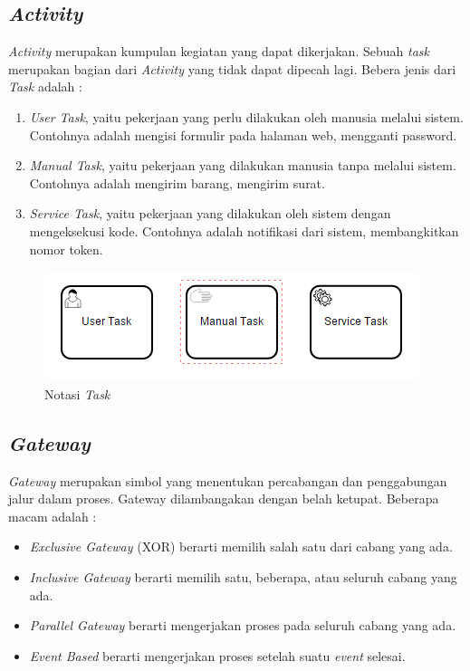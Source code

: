 \subsection{\textit{Activity}}
\label{sec:activity}
\textit{Activity} merupakan kumpulan kegiatan yang dapat dikerjakan. Sebuah \textit{task} merupakan bagian dari \textit{Activity} yang tidak dapat dipecah lagi. Bebera jenis dari \textit{Task} adalah :
	\begin{enumerate}
		\item{\textit{User Task}}, yaitu pekerjaan yang perlu dilakukan oleh manusia melalui sistem. Contohnya adalah mengisi formulir pada halaman web, mengganti password.
		\item{\textit{Manual Task}}, yaitu pekerjaan yang dilakukan manusia tanpa melalui sistem. Contohnya adalah mengirim barang, mengirim surat.
		\item{\textit{Service Task}}, yaitu pekerjaan yang dilakukan oleh sistem dengan mengeksekusi kode. Contohnya adalah notifikasi dari sistem, membangkitkan nomor token. 
	\end{enumerate}
	
	
\begin{figure}[H]
	\centering
	\includegraphics[scale=1]{Gambar/Bab-2/bpmn/task}
	\caption{Notasi \textit{Task}} 
	\label{task}
\end{figure}

\subsection{\textit{Gateway}}
\label{sec:gateway}
\textit{Gateway} merupakan simbol yang menentukan percabangan dan penggabungan jalur dalam proses. Gateway dilambangakan dengan belah ketupat. Beberapa macam adalah :
\begin{itemize}
	\item \textit{Exclusive Gateway} (XOR) berarti memilih salah satu dari cabang yang ada. 
	\item \textit{Inclusive Gateway} berarti memilih satu, beberapa, atau seluruh cabang yang ada.
	\item \textit{Parallel Gateway} berarti mengerjakan proses pada seluruh cabang yang ada.
	\item \textit{Event Based} berarti mengerjakan proses setelah suatu \textit{event} selesai.
\end{itemize} 

